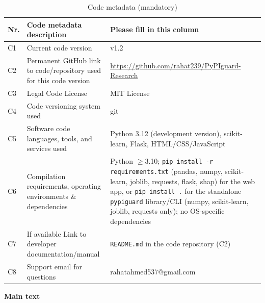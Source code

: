 \documentclass[preprint,12pt, a4paper]{elsarticle}
\begin{document}
\begin{table}[htbp]
\begin{tabular}{|l|p{6.5cm}|p{6.5cm}|}
\hline
\textbf{Nr.} & \textbf{Code metadata description} & \textbf{Please fill in this column} \\
\hline
C1 & Current code version & v1.2 \\
\hline
C2 & Permanent GitHub link to code/repository used for this code version & \url{https://github.com/rahat239/PyPIguard-Research} \\
\hline
C3 & Legal Code License   & MIT License \\
\hline
C4 & Code versioning system used & git \\
\hline
C5 & Software code languages, tools, and services used & Python 3.12 (development version), scikit-learn, Flask, HTML/CSS/JavaScript \\
\hline
C6 & Compilation requirements, operating environments \& dependencies & Python $\geq$3.10; \texttt{pip install -r requirements.txt} (pandas, numpy, scikit-learn, joblib, requests, flask, shap) for the web app, or \texttt{pip install .} for the standalone \texttt{pypiguard} library/CLI (numpy, scikit-learn, joblib, requests only); no OS-specific dependencies \\
\hline
C7 & If available Link to developer documentation/manual & \texttt{README.md} in the code repository (C2) \\
\hline
C8 & Support email for questions & rahatahmed537@gmail.com \\
\hline
\end{tabular}
\caption{Code metadata (mandatory)}
\label{tab:metadata}
\end{table}

\textbf{Main text}\\
\end{document}
